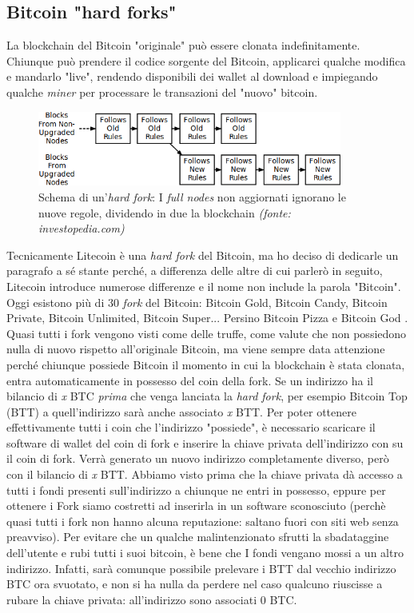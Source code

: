 \documentclass {article}
\begin{document}
\subsection {Bitcoin "hard forks"}


La blockchain del Bitcoin "originale" può essere clonata indefinitamente. Chiunque può prendere il codice sorgente del Bitcoin, applicarci qualche modifica e mandarlo "live", rendendo disponibili dei wallet al download e impiegando qualche \textit{miner} per processare le transazioni del "nuovo" bitcoin.

\vspace {0.5cm}
\begin{figure}[htb!]
\includegraphics [width = 10cm] {hard_fork.png}
\centering
\caption {Schema di un'\textit{hard fork}: I \textit{full nodes} non aggiornati ignorano le nuove regole, dividendo in due la blockchain \textit{(fonte: investopedia.com)}}
\end{figure}
\vspace {0.2cm}
\noindent
%
Tecnicamente Litecoin è una \textit{hard fork} del Bitcoin, ma ho deciso di dedicarle un paragrafo a sé stante perché, a differenza delle altre di cui parlerò in seguito, Litecoin introduce numerose differenze e il nome non include la parola "Bitcoin".
Oggi esistono più di 30 \textit{fork} del Bitcoin: Bitcoin Gold, Bitcoin Candy, Bitcoin Private, Bitcoin Unlimited, Bitcoin Super... Persino Bitcoin Pizza e Bitcoin God \cite{btcforks}.
Quasi tutti i fork vengono visti come delle truffe, come valute che non possiedono nulla di nuovo rispetto all'originale Bitcoin, ma viene sempre data attenzione perché chiunque possiede Bitcoin il momento in cui la blockchain è stata clonata, entra automaticamente in possesso del coin della fork.
Se un indirizzo ha il bilancio di \textit{x} BTC \emph{prima} che venga lanciata la \textit{hard fork}, per esempio Bitcoin Top (BTT) a quell'indirizzo sarà anche associato \textit{x} BTT.
Per poter ottenere effettivamente tutti i coin che l'indirizzo "possiede", è necessario scaricare il software di wallet del coin di fork e inserire la chiave privata dell'indirizzo con su il coin di fork.
Verrà generato un nuovo indirizzo completamente diverso, però con il bilancio di \textit{x} BTT.
Abbiamo visto prima che la chiave privata dà accesso a tutti i fondi presenti sull'indirizzo a chiunque ne entri in possesso, eppure per ottenere i Fork siamo costretti ad inserirla in un software sconosciuto (perchè quasi tutti i fork non hanno alcuna reputazione: saltano fuori con siti web senza preavviso).
Per evitare che un qualche malintenzionato sfrutti la sbadataggine dell'utente e rubi tutti i suoi bitcoin, è bene che I fondi vengano mossi a un altro indirizzo.
Infatti, sarà comunque possibile prelevare i BTT dal vecchio indirizzo BTC ora svuotato, e non si ha nulla da perdere nel caso qualcuno riuscisse a rubare la chiave privata: all'indirizzo sono associati 0 BTC.
\end{document}
